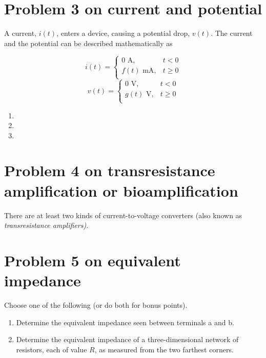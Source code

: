 \documentclass[11pt]{book}
\begin{document}
\section{Problem 3 on current and potential}
A current, $i(t)$, enters a device, causing a potential drop, $v(t)$. The current and the potential can be described mathematically as

\begin{equation*}
	i(t) = \begin{cases} 
      0 \text{ A}, & t< 0\\
      f(t) \text{ mA}, & t \geq0 \\
   \end{cases}
\end{equation*}
\begin{equation*}
	v(t) = \begin{cases} 
      0 \text{ V}, & t< 0\\
      g(t) \text{ V}, & t \geq0 \\
   \end{cases}
\end{equation*}

\begin{enumerate}
	\item 
	\item 
	\item 
\end{enumerate}

\newpage

\section{Problem 4 on transresistance amplification or bioamplification}
There are at least two kinds of current-to-voltage converters (also known as \textit{transresistance amplifiers)}.

\section{Problem 5 on equivalent impedance}
Choose one of the following (or do both for bonus points).
\begin{enumerate}
	\item Determine the equivalent impedance seen between terminals a and b.
	\item Determine the equivalent impedance of a three-dimensional network of resistors, each of value $R$, as measured from the two farthest corners.
\end{enumerate}
\end{document}
